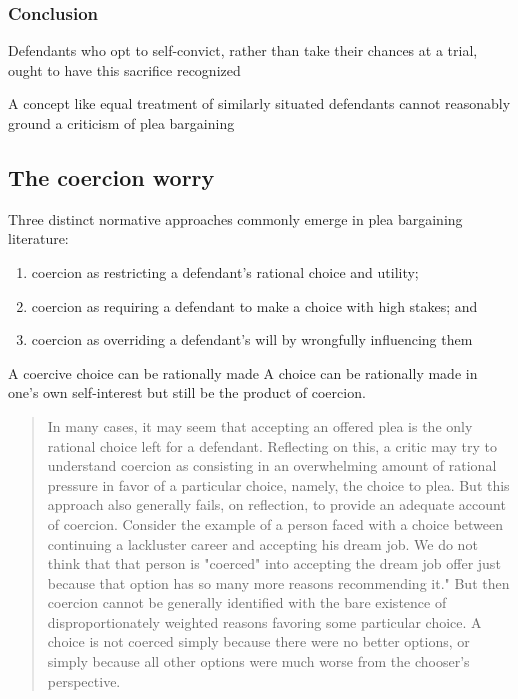 \subsubsection{Conclusion}

Defendants who opt to self-convict, rather than take their chances at a trial, ought to have this sacrifice recognized

A concept like equal treatment of similarly situated defendants cannot reasonably ground a criticism of plea bargaining

\subsection{The coercion worry}

Three distinct normative approaches commonly emerge in plea bargaining literature:

\begin{enumerate}
    \item coercion as restricting a defendant's rational choice and utility;
    \item coercion as requiring a defendant to make a choice with high stakes; and
    \item coercion as overriding a defendant's will by wrongfully influencing them
\end{enumerate}

A coercive choice can be rationally made
A choice can be rationally made in one's own self-interest but still be the product of coercion.

\begin{quote}
    In many cases, it may seem that accepting an offered plea is the only rational choice left for a defendant. Reflecting on this, a critic may try to understand coercion as consisting in an overwhelming amount of rational pressure in favor of a particular choice, namely, the choice to plea. But this approach also generally fails, on reflection, to provide an adequate account of coercion. Consider the example of a person faced with a choice between continuing a lackluster career and accepting his dream job. We do not think that that person is "coerced" into accepting the dream job offer just because that option has so many more reasons recommending it." But then coercion cannot be generally identified with the bare existence of disproportionately weighted reasons favoring some particular choice. A choice is not coerced simply because there were no better options, or simply because all other options were much worse from the chooser's perspective.
\end{quote}

